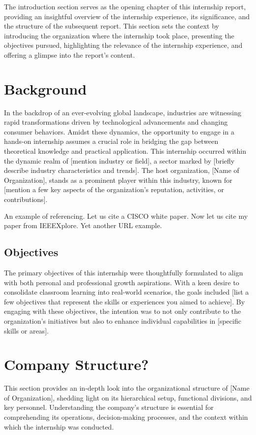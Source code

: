 The introduction section serves as the opening chapter of this internship report, providing an insightful overview of the internship experience, its significance, and the structure of the subsequent report. This section sets the context by introducing the organization where the internship took place, presenting the objectives pursued, highlighting the relevance of the internship experience, and offering a glimpse into the report's content.

\section{Background}
In the backdrop of an ever-evolving global landscape, industries are witnessing rapid transformations driven by technological advancements and changing consumer behaviors. Amidst these dynamics, the opportunity to engage in a hands-on internship assumes a crucial role in bridging the gap between theoretical knowledge and practical application. This internship occurred within the dynamic realm of [mention industry or field], a sector marked by [briefly describe industry characteristics and trends]. The host organization, [Name of Organization], stands as a prominent player within this industry, known for [mention a few key aspects of the organization's reputation, activities, or contributions].


An example of referencing. Let us cite a CISCO white paper\cite{cisco}.
Now let us cite my paper from IEEEXplore\cite{mugume1}. Yet another URL example\cite{WinNT}.

\subsection{Objectives}
The primary objectives of this internship were thoughtfully formulated to align with both personal and professional growth aspirations. With a keen desire to consolidate classroom learning into real-world scenarios, the goals included [list a few objectives that represent the skills or experiences you aimed to achieve]. By engaging with these objectives, the intention was to not only contribute to the organization's initiatives but also to enhance individual capabilities in [specific skills or areas].

\section{Company Structure?}
This section provides an in-depth look into the organizational structure of [Name of Organization], shedding light on its hierarchical setup, functional divisions, and key personnel. Understanding the company's structure is essential for comprehending its operations, decision-making processes, and the context within which the internship was conducted.

